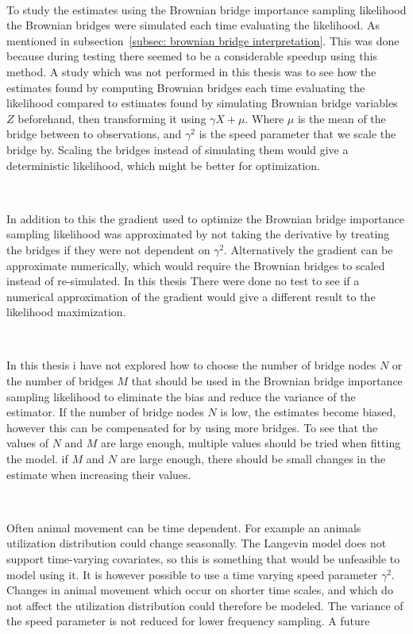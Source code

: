 \

To study the estimates using the Brownian bridge importance sampling likelihood the Brownian bridges were simulated each time evaluating the likelihood. As mentioned in subsection~\ref{subsec: brownian bridge interpretation}. This was done because during testing there seemed to be a considerable speedup using this method. A study which was not performed in this thesis was to see how the estimates found by computing Brownian bridges each time evaluating the likelihood compared to estimates found by simulating Brownian bridge variables $Z$ beforehand, then transforming it using $\gamma X +\mu$. Where $\mu$ is the mean of the bridge between to observations, and $\gamma^2$ is the speed parameter that we scale the bridge by. Scaling the bridges instead of simulating them would give a deterministic likelihood, which might be better for optimization.

\

In addition to this the gradient used to optimize the Brownian bridge importance sampling likelihood was approximated by not taking the derivative by treating the bridges if they were not dependent on $\gamma^2$. Alternatively the gradient can be approximate numerically, which would require the Brownian bridges to scaled instead of re-simulated. In this thesis There were done no test to see if a numerical approximation of the gradient would give a different result to the likelihood maximization.

\

In this thesis i have not explored how to choose the number of bridge nodes $N$ or the number of bridges $M$ that should be used in the Brownian bridge importance sampling likelihood to eliminate the bias and reduce the variance of the estimator. If the number of bridge nodes $N$ is low, the estimates become biased,  however this can be compensated for by using more bridges. To see that the values of $N$ and $M$ are large enough, multiple values should be tried when fitting the model. if $M$ and $N$ are large enough, there should be small changes in the estimate when increasing their values. 

\

Often animal movement can be time dependent. For example an animals utilization distribution could change seasonally. The Langevin model does not support time-varying covariates, so this is something that would be unfeasible to model using it. It is however possible to use a time varying speed parameter $\gamma^2$. Changes in animal movement which occur on shorter time scales, and which do not affect the utilization distribution could therefore be modeled. The variance of the speed parameter is not reduced for lower frequency sampling. A future 





